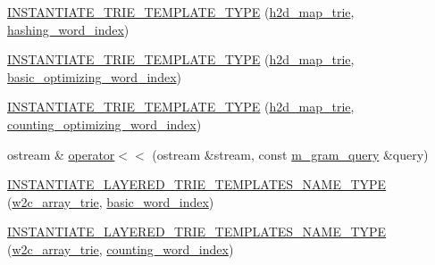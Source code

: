 \begin{DoxyCompactItemize}
\item 
\hyperlink{namespaceuva_1_1smt_1_1bpbd_1_1server_1_1lm_ac7ee69e8f80c6110e0e2d9b026d3758c}{I\+N\+S\+T\+A\+N\+T\+I\+A\+T\+E\+\_\+\+T\+R\+I\+E\+\_\+\+T\+E\+M\+P\+L\+A\+T\+E\+\_\+\+T\+Y\+P\+E} (\hyperlink{classuva_1_1smt_1_1bpbd_1_1server_1_1lm_1_1h2d__map__trie}{h2d\+\_\+map\+\_\+trie}, \hyperlink{classuva_1_1smt_1_1bpbd_1_1server_1_1lm_1_1dictionary_1_1hashing__word__index}{hashing\+\_\+word\+\_\+index})
\item 
\hyperlink{namespaceuva_1_1smt_1_1bpbd_1_1server_1_1lm_aeed22622ecff9b8286c4371202f3e27d}{I\+N\+S\+T\+A\+N\+T\+I\+A\+T\+E\+\_\+\+T\+R\+I\+E\+\_\+\+T\+E\+M\+P\+L\+A\+T\+E\+\_\+\+T\+Y\+P\+E} (\hyperlink{classuva_1_1smt_1_1bpbd_1_1server_1_1lm_1_1h2d__map__trie}{h2d\+\_\+map\+\_\+trie}, \hyperlink{namespaceuva_1_1smt_1_1bpbd_1_1server_1_1lm_1_1dictionary_a3001583c904eec702b4a4125082a7ecd}{basic\+\_\+optimizing\+\_\+word\+\_\+index})
\item 
\hyperlink{namespaceuva_1_1smt_1_1bpbd_1_1server_1_1lm_a2fb2ab9a0762410ae19b10817f343950}{I\+N\+S\+T\+A\+N\+T\+I\+A\+T\+E\+\_\+\+T\+R\+I\+E\+\_\+\+T\+E\+M\+P\+L\+A\+T\+E\+\_\+\+T\+Y\+P\+E} (\hyperlink{classuva_1_1smt_1_1bpbd_1_1server_1_1lm_1_1h2d__map__trie}{h2d\+\_\+map\+\_\+trie}, \hyperlink{namespaceuva_1_1smt_1_1bpbd_1_1server_1_1lm_1_1dictionary_a61cbd647b15de785ccf4cdd26661c366}{counting\+\_\+optimizing\+\_\+word\+\_\+index})
\item 
ostream \& \hyperlink{namespaceuva_1_1smt_1_1bpbd_1_1server_1_1lm_abcfabc5573e470b2435096fbb70b0822}{operator$<$$<$} (ostream \&stream, const \hyperlink{classuva_1_1smt_1_1bpbd_1_1server_1_1lm_1_1m__gram__query}{m\+\_\+gram\+\_\+query} \&query)
\item 
\hyperlink{namespaceuva_1_1smt_1_1bpbd_1_1server_1_1lm_a7ca41531b2a40b792eb426bf7b036d57}{I\+N\+S\+T\+A\+N\+T\+I\+A\+T\+E\+\_\+\+L\+A\+Y\+E\+R\+E\+D\+\_\+\+T\+R\+I\+E\+\_\+\+T\+E\+M\+P\+L\+A\+T\+E\+S\+\_\+\+N\+A\+M\+E\+\_\+\+T\+Y\+P\+E} (\hyperlink{classuva_1_1smt_1_1bpbd_1_1server_1_1lm_1_1w2c__array__trie}{w2c\+\_\+array\+\_\+trie}, \hyperlink{classuva_1_1smt_1_1bpbd_1_1server_1_1lm_1_1dictionary_1_1basic__word__index}{basic\+\_\+word\+\_\+index})
\item 
\hyperlink{namespaceuva_1_1smt_1_1bpbd_1_1server_1_1lm_a5ced2df249e10a494ed699e60b47edd7}{I\+N\+S\+T\+A\+N\+T\+I\+A\+T\+E\+\_\+\+L\+A\+Y\+E\+R\+E\+D\+\_\+\+T\+R\+I\+E\+\_\+\+T\+E\+M\+P\+L\+A\+T\+E\+S\+\_\+\+N\+A\+M\+E\+\_\+\+T\+Y\+P\+E} (\hyperlink{classuva_1_1smt_1_1bpbd_1_1server_1_1lm_1_1w2c__array__trie}{w2c\+\_\+array\+\_\+trie}, \hyperlink{classuva_1_1smt_1_1bpbd_1_1server_1_1lm_1_1dictionary_1_1counting__word__index}{counting\+\_\+word\+\_\+index})

\end{DoxyCompactItemize}
